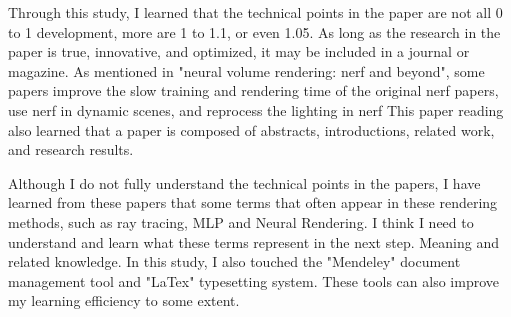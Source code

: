 \documentclass[UTF-8]{ctexart}
\begin{document}
Through this study, I learned that the technical points in the paper are not all 0 to 1 development, more are 1 to 1.1, or even 1.05. As long as the research in the paper is true, innovative, and optimized, it may be included in a journal or magazine. As mentioned in "neural volume rendering: nerf and beyond", some papers improve the slow training and rendering time of the original nerf papers, use nerf in dynamic scenes, and reprocess the lighting in nerf This paper reading also learned that a paper is composed of abstracts, introductions, related work, and research results.\par

Although I do not fully understand the technical points in the papers, I have learned from these papers that some terms that often appear in these rendering methods, such as ray tracing, MLP and Neural Rendering. I think I need to understand and learn what these terms represent in the next step. Meaning and related knowledge. In this study, I also touched the "Mendeley" document management tool and "LaTex" typesetting system. These tools can also improve my learning efficiency to some extent.
\end{document}
